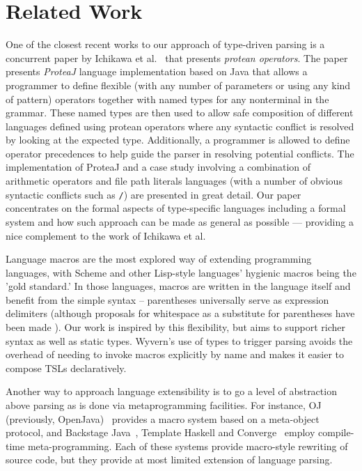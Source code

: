 \section{Related Work}
\label{s:related}

One of the closest recent works to our approach of type-driven parsing is a concurrent paper by Ichikawa et al.~\cite{Ichikawa:2014:CUO:2584469.2577092} that presents \textit{protean operators}. The paper presents \textit{ProteaJ} language implementation based on Java that allows a programmer to define flexible (with any number of parameters or using any kind of pattern) operators together with named types for any nonterminal in the grammar. These named types are then used to allow safe composition of different languages defined using protean operators where any syntactic conflict is resolved by looking at the expected type. Additionally, a programmer is allowed to define operator precedences to help guide the parser in resolving potential conflicts. The implementation of ProteaJ and a case study involving a combination of arithmetic operators and file path literals languages (with a number of obvious syntactic conflicts such as \lstinline{/}) are presented in great detail. Our paper concentrates on the formal aspects of type-specific languages including a formal system and how such approach can be made as general as possible --- providing a nice complement to the work of Ichikawa et al.




Language macros are the most explored way of extending programming languages, with Scheme and other Lisp-style languages' hygienic macros being the 'gold standard.' In those languages, macros are written in the language itself and benefit from the simple syntax -- parentheses universally serve as expression delimiters (although proposals for whitespace as a substitute for parentheses have been made \cite{srfi-49}). Our work is inspired by this flexibility, but aims to support richer syntax as well as static types. Wyvern's use of types to trigger parsing  avoids the overhead of needing to invoke macros explicitly by name and makes it easier to compose TSLs declaratively.

Another way to approach language extensibility is to go a level of abstraction above parsing as is done via metaprogramming facilities. For instance, OJ (previously, OpenJava)~\cite{Tatsubori00openjava:a} provides a macro system based on a meta-object protocol, and Backstage Java~\cite{Palmer:2011:BJM:2048066.2048137}, Template Haskell \cite{sheard2002template} and Converge~\cite{Tratt:2008:DSL:1391956.1391958} employ compile-time meta-programming.  Each of these systems provide macro-style rewriting of source code, but they provide at most limited extension of language parsing.

